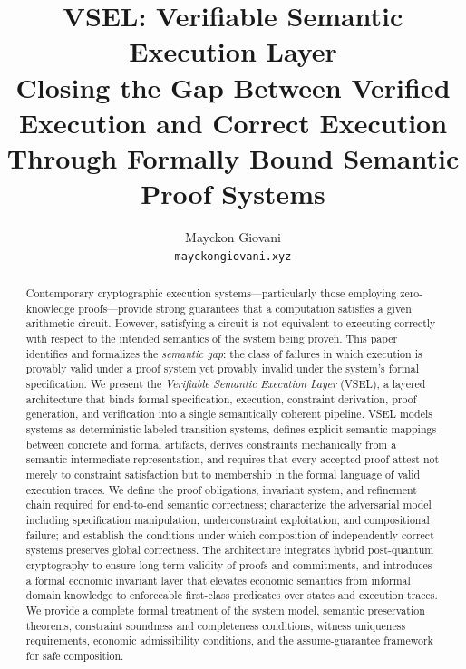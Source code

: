 \documentclass[11pt,a4paper]{article}
\title{\textbf{VSEL: Verifiable Semantic Execution Layer} \\[6pt]
\large Closing the Gap Between Verified Execution and Correct Execution \\
Through Formally Bound Semantic Proof Systems}
\author{Mayckon Giovani \\
\texttt{mayckongiovani.xyz}}
\date{}
\theoremstyle{definition}
\begin{document}
\maketitle

\begin{abstract}
Contemporary cryptographic execution systems---particularly those employing zero-knowledge proofs---provide strong guarantees that a computation satisfies a given arithmetic circuit. However, satisfying a circuit is not equivalent to executing correctly with respect to the intended semantics of the system being proven. This paper identifies and formalizes the \emph{semantic gap}: the class of failures in which execution is provably valid under a proof system yet provably invalid under the system's formal specification. We present the \emph{Verifiable Semantic Execution Layer} (VSEL), a layered architecture that binds formal specification, execution, constraint derivation, proof generation, and verification into a single semantically coherent pipeline. VSEL models systems as deterministic labeled transition systems, defines explicit semantic mappings between concrete and formal artifacts, derives constraints mechanically from a semantic intermediate representation, and requires that every accepted proof attest not merely to constraint satisfaction but to membership in the formal language of valid execution traces. We define the proof obligations, invariant system, and refinement chain required for end-to-end semantic correctness; characterize the adversarial model including specification manipulation, underconstraint exploitation, and compositional failure; and establish the conditions under which composition of independently correct systems preserves global correctness. The architecture integrates hybrid post-quantum cryptography to ensure long-term validity of proofs and commitments, and introduces a formal economic invariant layer that elevates economic semantics from informal domain knowledge to enforceable first-class predicates over states and execution traces. We provide a complete formal treatment of the system model, semantic preservation theorems, constraint soundness and completeness conditions, witness uniqueness requirements, economic admissibility conditions, and the assume-guarantee framework for safe composition.
\end{abstract}

\end{document}
